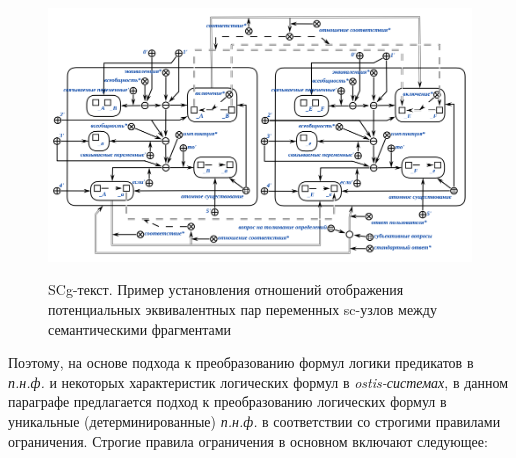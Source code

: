 \begin{figure}[H]
	\caption{SCg-текст. Пример установления отношений отображения потенциальных эквивалентных пар переменных sc-узлов между семантическими фрагментами}
	\includegraphics[scale=0.65]{author/part7/figures/establishment_mapping_relationship_example.png}
	\label{fig:EMR_example}
\end{figure}

Поэтому, на основе подхода к преобразованию формул логики предикатов в \textit{п.н.ф.} и некоторых характеристик логических формул в \textit{ostis-системах}, в данном параграфе предлагается подход к преобразованию логических формул в уникальные (детерминированные) \textit{п.н.ф.} в соответствии со строгими правилами ограничения. Строгие правила ограничения в основном включают следующее:

